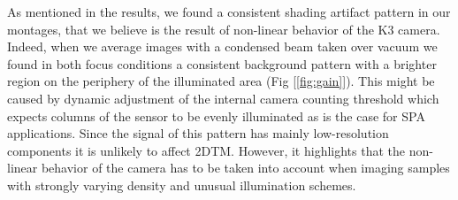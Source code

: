 \documentclass[
]{article}
\begin{document}
As mentioned in the results, we found a consistent shading artifact
pattern in our montages, that we believe is the result of non-linear
behavior of the K3 camera. Indeed, when we average images with a
condensed beam taken over vacuum we found in both focus conditions a
consistent background pattern with a brighter region on the periphery of
the illuminated area (Fig {[}\ref{fig:gain}{]}). This might be caused by dynamic
adjustment of the internal camera counting threshold which expects
columns of the sensor to be evenly illuminated as is the case for SPA
applications. Since the signal of this pattern has mainly low-resolution
components it is unlikely to affect 2DTM. However, it highlights that
the non-linear behavior of the camera has to be taken into account when
imaging samples with strongly varying density and unusual illumination
schemes.
\end{document}
